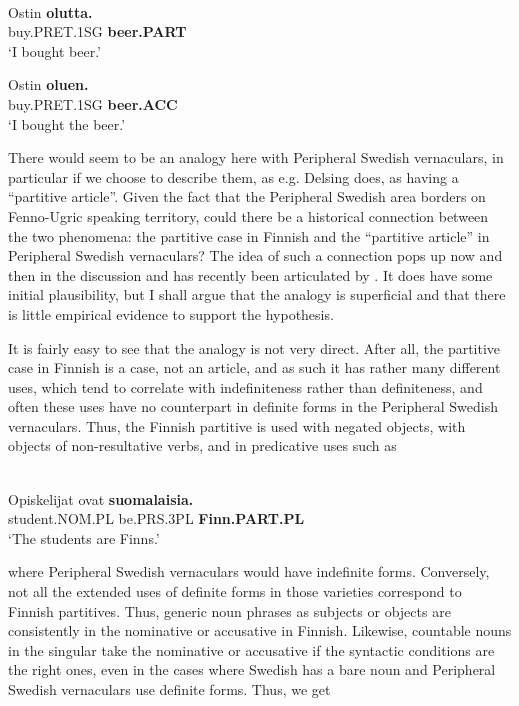 \ea\label{}
\\
\gll Ostin  \textbf{olutta.}\\
buy.PRET.1SG  \textbf{beer.PART}\\
\glt ‘I bought beer.’

\z

\ea
\gll Ostin  \textbf{oluen.}\\
buy.PRET.1SG  \textbf{beer.ACC}\\
\glt  ‘I bought the beer.’

\z

There would seem to be an analogy here with Peripheral Swedish vernaculars, in particular if we choose to describe them, as e.g. Delsing does, as having a “partitive article”. Given the fact that the Peripheral Swedish area borders on Fenno-Ugric speaking territory, could there be a historical connection between the two phenomena: the partitive case in Finnish and the “partitive article” in Peripheral Swedish vernaculars? The idea of such a connection pops up now and then in the discussion and has recently been articulated by \citet{Riesler2002}. It does have some initial plausibility, but I shall argue that the analogy is superficial and that there is little empirical evidence to support the hypothesis.


It is fairly easy to see that the analogy is not very direct. After all, the partitive case in Finnish is a case, not an article, and as such it has rather many different uses, which tend to correlate with indefiniteness rather than definiteness, and often these uses have no counterpart in definite forms in the Peripheral Swedish vernaculars. Thus, the Finnish partitive is used with negated objects, with objects of non-resultative verbs, and in predicative uses such as 


\ea \label{} 
\\
\gll Opiskelijat  ovat  \textbf{suomalaisia.}\\
student.NOM.PL  be.PRS.3PL  \textbf{Finn.PART.PL}\\
\glt ‘The students are Finns.’

\z

where Peripheral Swedish vernaculars would have indefinite forms. Conversely, not all the extended uses of definite forms in those varieties correspond to Finnish partitives. Thus, generic noun phrases as subjects or objects are consistently in the nominative or accusative in Finnish. Likewise, countable nouns in the singular take the nominative or accusative if the syntactic conditions are the right ones, even in the cases where Swedish has a bare noun and Peripheral Swedish vernaculars use definite forms. Thus, we get

